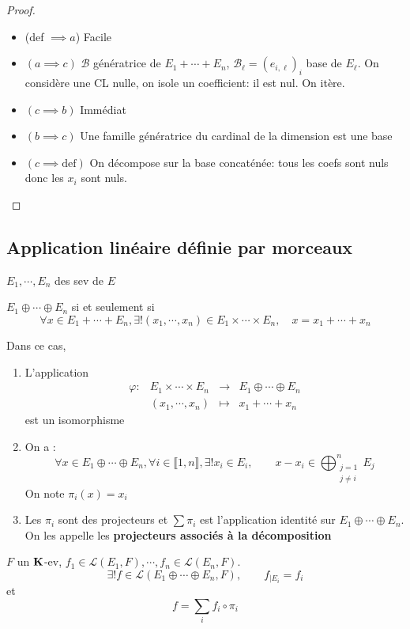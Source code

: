 \begin{proof}~
    \begin{itemize}
        \item (def $\implies a$) Facile
        \item $(a\implies c)$ $\mathcal  B$ génératrice de $E_1+\cdots +E_n$, $ \mathcal  B_{\ell }=(e_{i,\ell })_i$ base de $E_{\ell }$. On considère une CL nulle, on isole un coefficient: il est nul. On itère.
        \item $(c \implies b)$ Immédiat
        \item $(b \implies c)$ Une famille génératrice du cardinal de la dimension est une base
        \item $(c \implies \text{def})$ On décompose sur la base concaténée: tous les coefs sont nuls donc les  $x_i$ sont nuls.
    \end{itemize}
\end{proof}

\subsection{Application linéaire définie par morceaux}

\begin{thm}
    \Hyp $E_1, \cdots , E_n$ des sev de $E$

    \begin{concenum}
    \item  $E_1\oplus\cdots \oplus E_n$ si et seulement si \[
            \forall  x \in  E_1+\cdots +E_n, \exists !(x_1,\cdots ,x_n) \in  E_1\times \cdots \times E_n, \quad  x=x_1+\cdots +x_n
        \]
    \item Dans ce cas, \begin{enumerate}
        \item L'application \[
                \begin{matrix}
                    \varphi:& E_1\times \cdots \times E_n & \longrightarrow & E_1\oplus \cdots \oplus E_n \\
                            & (x_1, \cdots , x_n) & \longmapsto & x_1+\cdots +x_n
                \end{matrix}
            \]
            est un isomorphisme
        \item On a : \[
                \forall  x \in  E_1\oplus \cdots \oplus E_n, \forall  i \in  \llbracket 1, n \rrbracket , \exists !x_i \in  E_i, \quad  \quad  x-x_i \in  \bigoplus_{\substack{j=1\\j\neq i}}^n E_j
            \]
            On note $\pi_i(x)=x_i$
        \item Les  $\pi_i$ sont des projecteurs et  $\sum \pi_i$ est l'application identité sur  $E_1\oplus\cdots \oplus E_n$. On les appelle les \textbf{projecteurs associés à la décomposition}
    \end{enumerate}
\item $F$ un  $\mathbf K$-ev, $f_1 \in  \mathcal  L(E_1, F), \cdots , f_n \in  \mathcal  L(E_n,F)$. \[
    \exists !f \in  \mathcal  L(E_1\oplus \cdots \oplus E_n, F), \qquad f_{|E_i}=f_i \]
    et \[
        f=\sum_i f_i\circ \pi_i
    \]
\end{concenum}
 \end{thm}


